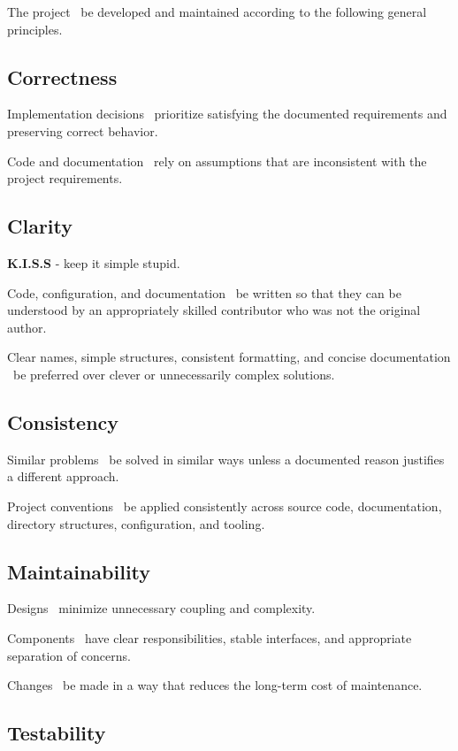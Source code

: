 The project \should~be developed and maintained according to the following general principles.

\subsection{Correctness}

Implementation decisions \should~prioritize satisfying the documented requirements and preserving correct behavior.

Code and documentation \shouldnot~rely on assumptions that are inconsistent with the project requirements.

\subsection{Clarity}

\textbf{K.I.S.S} - keep it simple stupid.

Code, configuration, and documentation \should~be written so that they can be understood by an appropriately skilled contributor who was not the original author.

Clear names, simple structures, consistent formatting, and concise documentation \should~be preferred over clever or unnecessarily complex solutions.

\subsection{Consistency}

Similar problems \should~be solved in similar ways unless a documented reason justifies a different approach.

Project conventions \should~be applied consistently across source code, documentation, directory structures, configuration, and tooling.

\subsection{Maintainability}

Designs \should~minimize unnecessary coupling and complexity.

Components \should~have clear responsibilities, stable interfaces, and appropriate separation of concerns.

Changes \should~be made in a way that reduces the long-term cost of maintenance.

\subsection{Testability}

